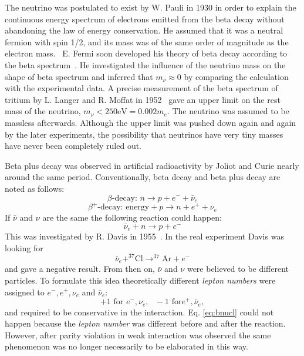 The neutrino was postulated to exist by W. Pauli in 1930 in order to
explain the continuous energy spectrum of electrons emitted from the
beta decay without abandoning the law of energy conservation. He
assumed that it was a neutral fermion with spin 1/2, and its mass was
of the same order of magnitude as the electron mass.~\cite{Pau30} E.
Fermi soon developed his theory of beta decay according to the beta
spectrum~\cite{Fer33,Fer34}. He investigated the influence of the
neutrino mass on the shape of beta spectrum and inferred that $m_\nu
\approx 0$ by comparing the calculation with the experimental data. A
precise measurement of the beta spectrum of tritium by L. Langer and
R. Moffat in 1952~\cite{Lan52} gave an upper limit on the rest mass of
the neutrino, $m_\nu < 250 \mbox{eV} = 0.002m_e$. The neutrino was
assumed to be massless afterwards. Although the upper limit was pushed
down again and again by the later experiments, the possibility that
neutrinos have very tiny masses have never been completely ruled out.

Beta plus decay was observed in artificial radioactivity by Joliot and
Curie nearly around the same period. Conventionally, beta decay and
beta plus decay are noted as follows:
\begin{equation}
  \label{eq:bd}
  \beta\mbox{-decay: } n \rightarrow p+e^{-}+\bar{\nu}_e
\end{equation}
\begin{equation}
  \label{eq:bpd}
  \beta^+\mbox{-decay: energy} + p \rightarrow n+e^{+}+\nu_e
\end{equation}
If $\bar{\nu}$ and $\nu$ are the same the following reaction could
happen:
\begin{equation}
  \label{eq:bnun}
  \bar{\nu}_e + n \rightarrow p+e^{-}
\end{equation}
This was investigated by R. Davis in 1955~\cite{Dav55,Dav56}. In the
real experiment Davis was looking for
\begin{equation}
  \label{eq:bnucl}
  \bar{\nu}_e + ^{37}\mbox{Cl} \rightarrow ^{37}\mbox{Ar}+e^{-}
\end{equation}
and gave a negative result. From then on, $\bar{\nu}$ and $\nu$ were
believed to be different particles. To formulate this idea
theoretically different \emph{lepton numbers} were assigned to $e^{-},
e^{+}, \nu_e$ and $\bar{\nu}_e$:
\begin{equation}
  \label{eq:ln}
  +1 \mbox{ for }e^{-}, \nu_e, \mbox{   }-1 \mbox{ for
}e^{+},\bar{\nu}_e,
\end{equation}
and required to be conservative in the interaction. Eq. \ref{eq:bnucl}
could not happen because the \emph{lepton number} was different before
and after the reaction. However, after parity violation in weak
interaction was observed the same phenomenon was no longer necessarily
to be elaborated in this way.

